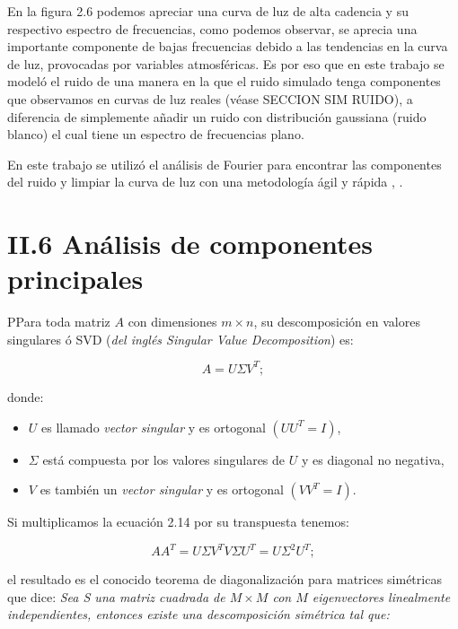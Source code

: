 En la figura 2.6 podemos apreciar una curva de luz de alta cadencia y su respectivo espectro de frecuencias, como podemos observar, se aprecia una importante componente de bajas frecuencias debido a las tendencias en la curva de luz, provocadas por variables atmosféricas. Es por eso que en este trabajo se modeló el ruido de una manera en la que el ruido simulado tenga componentes que observamos en curvas de luz reales (véase SECCION SIM RUIDO), a diferencia de simplemente añadir un ruido con distribución gaussiana (ruido blanco) el cual tiene un espectro de frecuencias plano.

En este trabajo se utilizó el análisis de Fourier para encontrar las componentes del ruido y limpiar la curva de luz con una metodología ágil y rápida \cite{kosarev1983optimal}, \cite{brault1971analysis}. 

\section*{II.6 Análisis de componentes principales}

PPara toda matriz $A$ con dimensiones $m\times n$, su descomposición en valores singulares ó SVD (\textit{del inglés Singular Value Decomposition}) es:

\begin{equation}
  \displaystyle A=U\Sigma V^{T};
\end{equation}

\noindent donde:\\

\begin{itemize}
  \item $U$ es llamado \textit{vector singular} y es ortogonal $(UU^{T}=I)$,
  \item $\Sigma$ está compuesta por los valores singulares de $U$ y es diagonal no negativa,
  \item $V$ es también un \textit{vector singular} y es ortogonal $(VV^{T}=I)$.
\end{itemize}

Si multiplicamos la ecuación 2.14 por su transpuesta tenemos:

\begin{equation}
  \displaystyle AA^{T}=U\Sigma V^{T} V\Sigma U^{T} = U \Sigma^{2} U^{T};
\end{equation}

\noindent el resultado es el conocido teorema de diagonalización para matrices simétricas que dice: \textit{Sea S una matriz cuadrada de $M\times M$ con $M$ eigenvectores linealmente independientes, entonces existe una descomposición simétrica tal que:}

